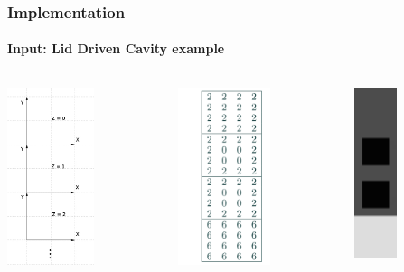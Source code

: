 \documentclass{beamer}
\begin{document}
\begin{frame}
\frametitle{Implementation}
\framesubtitle{Input: Lid Driven Cavity example}
\begin{columns}
\begin{column}{0.33\textwidth}
\includegraphics[height=5.2cm]{coord.jpg}
\end{column}
\begin{column}{0.33\textwidth}
\includegraphics[height=5.2cm]{cavity.png}
\end{column}
\begin{column}{0.33\textwidth}
\includegraphics[height=5cm]{cavity20202.jpg}
\end{column}
\end{columns}
\end{frame}
\end{document}
